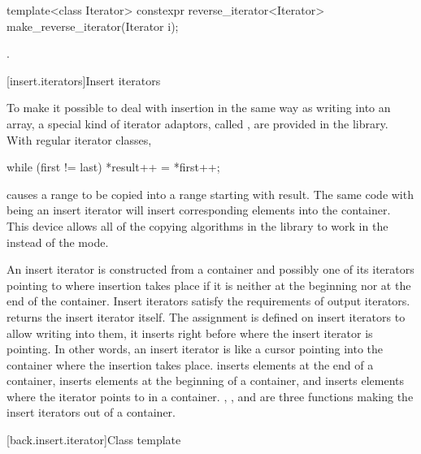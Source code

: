 %
%
\begin{itemdecl}
template<class Iterator>
  constexpr reverse_iterator<Iterator> make_reverse_iterator(Iterator i);
\end{itemdecl}

\begin{itemdescr}
\pnum
\returns
{}.
\end{itemdescr}

[insert.iterators]{Insert iterators}

\pnum
To make it possible to deal with insertion in the same way as writing into an array, a special kind of iterator
adaptors, called
,
are provided in the library.
With regular iterator classes,

\begin{codeblock}
while (first != last) *result++ = *first++;
\end{codeblock}

causes a range 
to be copied into a range starting with result.
The same code with
being an insert iterator will insert corresponding elements into the container.
This device allows all of the
copying algorithms in the library to work in the
instead of the  mode.

\pnum
An insert iterator is constructed from a container and possibly one of its iterators pointing to where
insertion takes place if it is neither at the beginning nor at the end of the container.
Insert iterators satisfy the requirements of output iterators.
returns the insert iterator itself.
The assignment
is defined on insert iterators to allow writing into them, it inserts
right before where the insert iterator is pointing.
In other words, an insert iterator is like a cursor pointing into the
container where the insertion takes place.
inserts elements at the end of a container,
inserts elements at the beginning of a container, and
inserts elements where the iterator points to in a container.
,
,
and
are three
functions making the insert iterators out of a container.

[back.insert.iterator]{Class template }


